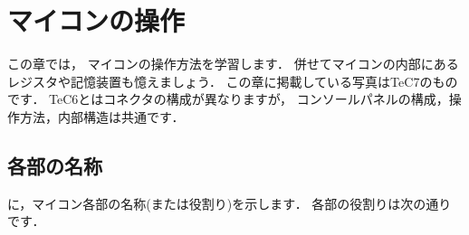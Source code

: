 \renewcommand{\myepsfbox}[1]{\epsfbox{chap4/#1}}

\chapter{マイコンの操作}

この章では，
マイコンの操作方法を学習します．
併せてマイコンの内部にあるレジスタや記憶装置も憶えましょう．
この章に掲載している写真はTeC7のものです．
TeC6とはコネクタの構成が異なりますが，
コンソールパネルの構成，操作方法，内部構造は共通です．


\section{各部の名称}
に，マイコン各部の名称(または役割り)を示します．
各部の役割りは次の通りです．

